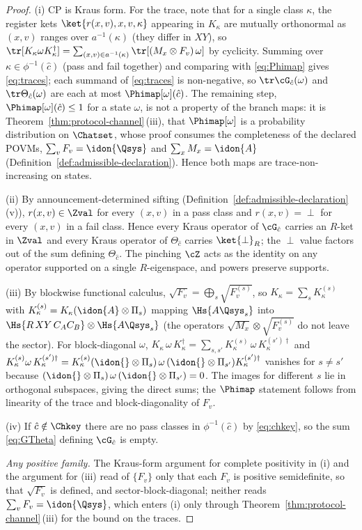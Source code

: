 \begin{proof}
(i) CP is Kraus form. For the trace, note that for a single class $\kappa$,
the register kets $\ket{r(x,v),x,v,\kappa}$ appearing in
$K_{\kappa}$ are mutually orthonormal as $(x,v)$ ranges over
$a^{-1}(\kappa)$ (they differ in $XY$), so
$\tr[K_{\kappa}\omega K_{\kappa}^{\dagger}]
=\sum_{(x,v)\in a^{-1}(\kappa)}\tr[(M_x\otimes F_v)\,\omega]$ by cyclicity.
Summing over $\kappa\in\phi^{-1}(\hat c)$ (pass and fail together) and
comparing with \eqref{eq:Phimap} gives \eqref{eq:traces}; each summand of
\eqref{eq:traces} is non-negative, so
$\tr\cG_{\hat c}(\omega)$ and $\tr\Theta_{\hat c}(\omega)$ are each at
most $\Phimap[\omega](\hat c)$. The remaining step,
$\Phimap[\omega](\hat c)\le1$ for a state $\omega$, is not a property of the
branch maps: it is
Theorem~\ref{thm:protocol-channel}\,(iii), that $\Phimap[\omega]$ is a probability
distribution on $\Chatset$, whose proof consumes the completeness of the
declared POVMs, $\sum_vF_v=\idon{\Qsys}$ and $\sum_xM_x=\idon{A}$
(Definition~\ref{def:admissible-declaration}). Hence both maps are trace-non-increasing on
states.

(ii) By announcement-determined sifting
(Definition~\ref{def:admissible-declaration}\,(v)), $r(x,v)\in\Zval$ for every $(x,v)$ in a
pass class and $r(x,v)=\perp$ for every $(x,v)$ in a fail class. Hence every
Kraus operator of $\cG_{\hat c}$ carries an $R$-ket in $\Zval$ and every
Kraus operator of $\Theta_{\hat c}$ carries $\ket{\perp}_R$; the $\perp$
value factors out of the sum defining $\Theta_{\hat c}$. The pinching $\cZ$
acts as the identity on any operator supported on a single $R$-eigenspace,
and powers preserve supports.

(iii) By blockwise functional calculus,
$\sqrt{F_v}=\bigoplus_s\sqrt{F_v^{(s)}}$, so
$K_{\kappa}=\sum_s K_{\kappa}^{(s)}$ with
$K_{\kappa}^{(s)}=K_{\kappa}(\idon{A}\otimes\Pi_s)$ mapping
$\Hs{A\Qsys_s}$ into $\Hs{R\,XY\,C_AC_B}\otimes\Hs{A\Qsys_s}$ (the operators
$\sqrt{M_x}\otimes\sqrt{F_v^{(s)}}$ do not leave the sector). For
block-diagonal $\omega$,
$K_{\kappa}\,\omega\,K_{\kappa}^{\dagger}
=\sum_{s,s'}K_{\kappa}^{(s)}\,\omega\,K_{\kappa}^{(s')\dagger}$
and $K_{\kappa}^{(s)}\omega\,K_{\kappa}^{(s')\dagger}
=K_{\kappa}^{(s)}(\idon{}\otimes\Pi_s)\,\omega\,(\idon{}\otimes\Pi_{s'})
K_{\kappa}^{(s')\dagger}$ vanishes for $s\ne s'$ because
$(\idon{}\otimes\Pi_s)\,\omega\,(\idon{}\otimes\Pi_{s'})=0$. The images for
different $s$ lie in orthogonal subspaces, giving the direct sums; the
$\Phimap$ statement follows from linearity of the trace and block-diagonality
of $F_v$.

(iv) If $\hat c\notin\Chkey$ there are no pass classes in $\phi^{-1}(\hat c)$
by \eqref{eq:chkey}, so the sum \eqref{eq:GTheta} defining
$\cG_{\hat c}$ is empty.

\emph{Any positive family.} The Kraus-form argument for complete
positivity in (i) and the argument for (iii) read of $\{F_v\}$ only that
each $F_v$ is positive semidefinite, so that $\sqrt{F_v}$ is defined, and
sector-block-diagonal; neither reads $\sum_vF_v=\idon{\Qsys}$, which
enters (i) only through Theorem~\ref{thm:protocol-channel}\,(iii) for the
bound on the traces.
\end{proof}
